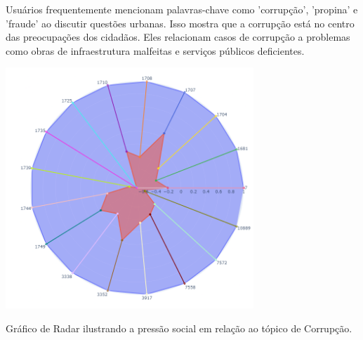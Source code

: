 Usuários frequentemente mencionam palavras-chave como 'corrupção', 'propina' e 'fraude' ao discutir questões urbanas. Isso mostra que a corrupção está no centro das preocupações dos cidadãos. Eles relacionam casos de corrupção a problemas como obras de infraestrutura malfeitas e serviços públicos deficientes.

\begin{quadro}[htb]
	\centering
	\includegraphics[width=0.7\textwidth]{images/social_barometer_corruption.png}
	\caption{Gráfico de Radar ilustrando a pressão social em relação ao tópico de Corrupção.}
	\label{fig:social_barometer_corruption}
\end{quadro}

